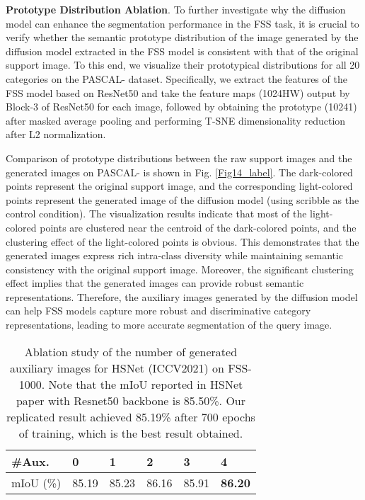 \documentclass[sigconf]{acmart}
\begin{document}
\textbf{Prototype Distribution Ablation}. To further investigate why the diffusion model can enhance the segmentation performance in the FSS task, it is crucial to verify whether the semantic prototype distribution of the image generated by the diffusion model extracted in the FSS model is consistent with that of the original support image. To this end, we visualize their prototypical distributions for all 20 categories on the PASCAL- dataset. Specifically, we extract the features of the FSS model based on ResNet50 and take the feature maps (1024HW) output by Block-3 of ResNet50 for each image, followed by obtaining the prototype (10241) after masked average pooling and performing T-SNE dimensionality reduction after L2 normalization. 

Comparison of prototype distributions between the raw support images and the generated images on PASCAL- is shown in Fig. \ref{Fig14_label}. The dark-colored points represent the original support image, and the corresponding light-colored points represent the generated image of the diffusion model (using scribble as the control condition). The visualization results indicate that most of the light-colored points are clustered near the centroid of the dark-colored points, and the clustering effect of the light-colored points is obvious. This demonstrates that the generated images express rich intra-class diversity while maintaining semantic consistency with the original support image. Moreover, the significant clustering effect implies that the generated images can provide robust semantic representations. Therefore, the auxiliary images generated by the diffusion model can help FSS models capture more robust and discriminative category representations, leading to more accurate segmentation of the query image.






\begin{table}[tb]
\centering
\caption{Ablation study of the number of generated auxiliary images for HSNet (ICCV2021) on FSS-1000. Note that the mIoU reported in HSNet paper \cite{HSNet2021} with Resnet50 backbone is 85.50\%. Our replicated result achieved 85.19\% after 700 epochs of training, which is the best result obtained.}
\label{table_Ablation2}
\begin{tabular}{llllll}
\toprule
\#Aux.       & 0     & 1     & 2     & 3     & \textbf{4}     \\ \hline
mIoU (\%) & 85.19 & 85.23 & 86.16 & 85.91 & \textbf{86.20}   \\ \bottomrule
\end{tabular}\end{table}
\end{document}
